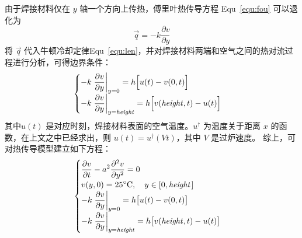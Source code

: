 \documentclass[../main.tex]{subfiles}
\begin{document}
由于焊接材料仅在 \(y\) 轴一个方向上传热，傅里叶热传导方程 Equ~\ref{equ:fou} 可以退化为
\begin{equation}
\vec q = {-} k \frac{\partial v}{ \partial y}
\end{equation}
将 \(\vec q\) 代入牛顿冷却定律Equ~\ref{equ:len}，并对焊接材料两端和空气之间的热对流过程进行分析，可得边界条件：
\begin{equation}\label{equ:bian}
\begin{cases}
\displaystyle- k \left.\frac{\partial v}{\partial y}\right|_{y = 0} =  h \Big[ u(t) - v(0, t)\Big] \\
\displaystyle- k \left.\frac{\partial v}{\partial y}\right|_{y = {\it height}} = h \Big[v({\it height}, t) - u(t)\Big]
\end{cases}
\end{equation}
其中\(u(t)\) 是对应时刻，焊接材料表面的空气温度。\(u ^{\dagger}\) 为温度关于距离 \(x\) 的函数，在上文之中已经求出，则 \(u (t) = u^{\dagger} ( Vt)\)，其中 \(V\) 是过炉速度。
综上，可对热传导模型建立如下方程：
\begin{equation}
\begin{cases}
\displaystyle \frac{\partial v}{\partial t} - a ^{2}  \frac{\partial ^{2} v}{\partial y^{2}} = 0 \\
\displaystyle v (y , 0) = 25 ^{\circ}\mathrm{C}, \quad y \in [0, {\it height\kern 1pt}] \\
\displaystyle- k \left.\frac{\partial v}{\partial y}\right|_{y = 0} =  h \big[u(t) - v(0, t)\big] \\
\displaystyle- k \left.\frac{\partial v}{\partial y}\right|_{y = {\it height}} = h \big[v({\it height}, t) - u(t)\big]
\end{cases}
\end{equation}

\end{document}
